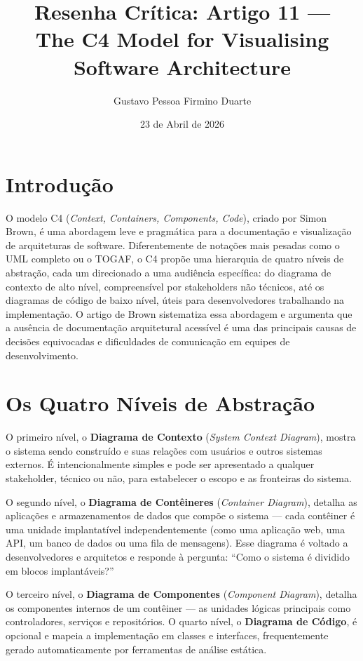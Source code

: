 \documentclass[12pt,a4paper]{article}
\title{Resenha Cr\'itica: Artigo 11 ---\\
The C4 Model for Visualising Software Architecture}
\author{Gustavo Pessoa Firmino Duarte}
\date{23 de Abril de 2026}
\begin{document}
\maketitle

\section{Introdu\c{c}\~ao}

O modelo C4 (\textit{Context, Containers, Components, Code}), criado por Simon
Brown, \'e uma abordagem leve e pragm\'atica para a documenta\c{c}\~ao e visualiza\c{c}\~ao
de arquiteturas de software. Diferentemente de nota\c{c}\~oes mais pesadas como
o UML completo ou o TOGAF, o C4 prop\~oe uma hierarquia de quatro n\'iveis de
abstra\c{c}\~ao, cada um direcionado a uma audi\^encia espec\'ifica: do diagrama
de contexto de alto n\'ivel, compreens\'ivel por stakeholders n\~ao t\'ecnicos,
at\'e os diagramas de c\'odigo de baixo n\'ivel, \'uteis para desenvolvedores
trabalhando na implementa\c{c}\~ao. O artigo de Brown sistematiza essa abordagem
e argumenta que a aus\^encia de documenta\c{c}\~ao arquitetural acess\'ivel \'e
uma das principais causas de decis\~oes equivocadas e dificuldades de comunica\c{c}\~ao
em equipes de desenvolvimento.

\section{Os Quatro N\'iveis de Abstra\c{c}\~ao}

O primeiro n\'ivel, o \textbf{Diagrama de Contexto} (\textit{System Context
Diagram}), mostra o sistema sendo constru\'ido e suas rela\c{c}\~oes com usu\'arios
e outros sistemas externos. \'E intencionalmente simples e pode ser apresentado
a qualquer stakeholder, t\'ecnico ou n\~ao, para estabelecer o escopo e as
fronteiras do sistema.

O segundo n\'ivel, o \textbf{Diagrama de Cont\^eineres} (\textit{Container
Diagram}), detalha as aplica\c{c}\~oes e armazenamentos de dados que comp\~oe o
sistema --- cada cont\^einer \'e uma unidade implantat\'ivel independentemente
(como uma aplica\c{c}\~ao web, uma API, um banco de dados ou uma fila de mensagens).
Esse diagrama \'e voltado a desenvolvedores e arquitetos e responde \`a pergunta:
``Como o sistema \'e dividido em blocos implant\'aveis?''

O terceiro n\'ivel, o \textbf{Diagrama de Componentes} (\textit{Component
Diagram}), detalha os componentes internos de um cont\^einer --- as unidades
l\'ogicas principais como controladores, servi\c{c}os e reposit\'orios. O quarto
n\'ivel, o \textbf{Diagrama de C\'odigo}, \'e opcional e mapeia a implementa\c{c}\~ao
em classes e interfaces, frequentemente gerado automaticamente por ferramentas
de análise est\'atica.
\end{document}
